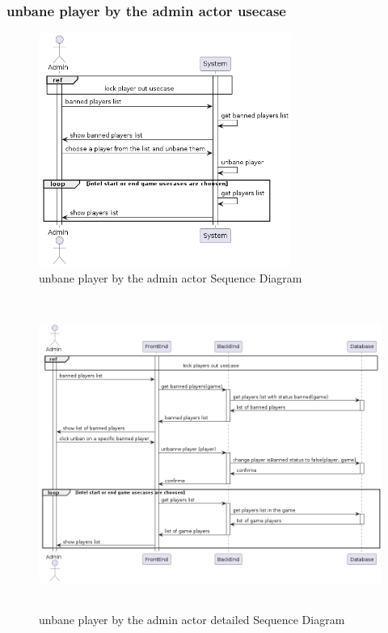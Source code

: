\documentclass{article}
\begin{document}
\subsubsection{unbane player by the admin actor usecase}
\begin{figure}[H]
	\centering
	\includegraphics[height=3in]{../thesis_tex/assets/diagrams/unbane_player_SD.png}
	\caption{unbane player by the admin actor Sequence Diagram}
\end{figure}

\begin{figure}[H]
	\centering
	\includegraphics[height=4in,width=6in]{../thesis_tex/assets/diagrams/unbane_player_detailedSD.png}
	\caption{unbane player by the admin actor detailed Sequence Diagram}
\end{figure}
\end{document}
